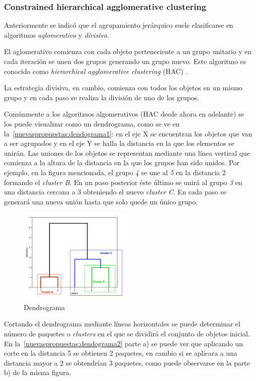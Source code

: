 \subsubsection{Constrained hierarchical agglomerative clustering}
Anteriormente se indicó que el agrupamiento jerárquico suele clasificarse en algoritmos \textit{aglomerativo} y \textit{divisivo}. 

El aglomerativo comienza con cada objeto perteneciente a un grupo unitario y en cada iteración se unen dos grupos generando un grupo nuevo. Este algoritmo es conocido como \textit{hierarchical agglomerative clustering} (HAC) \cite{journals/tkde/Amer-YahiaBCFMZ14,informationRetrival}. 

La estrategia divisiva, en cambio, comienza con todos los objetos en un mismo grupo y en cada paso se realiza la división de uno de los grupos.

Comúnmente a los algoritmos algomerativos (HAC desde ahora en adelante) se los puede visualizar como un dendrograma, como se ve en la~\autoref{nuevaspropuestas:dendograma1}: en el eje X se encuentran los objetos que van a ser agrupados y en el eje Y se halla la distancia en la que los elementos se unirán. Las uniones de los objetos se representan mediante una línea vertical que comienza a la altura de la distancia en la que los grupos han sido unidos. Por ejemplo, en la figura mencionada, el grupo \textit{4} se une al \textit{5} en la distancia 2 formando el \textit{cluster B}. En un paso posterior éste último se unirá al grupo \textit{3} en una distancia cercana a 3 obteniendo el nuevo \textit{cluster C}. En cada paso se generará una nueva unión hasta que solo quede un único grupo.

\begin{figure}[H]
  \centering
    \includegraphics[width=0.5\textwidth]{img/dendograma01.png}
  \caption{Dendrograma}
  \label{nuevaspropuestas:dendograma1}
\end{figure}

Cortando el dendrograma mediante líneas horizontales se puede determinar el número de paquetes o \emph{clusters} en el que se dividirá el conjunto de objetos inicial. En la~\autoref{nuevaspropuestas:dendograma2} parte a) se puede ver que aplicando un corte en la distancia 5 se obtienen 2 paquetes, en cambio si se aplicara a una distancia mayor a 2 se obtendrían 3 paquetes, como puede observarse en la parte b) de la misma figura.

